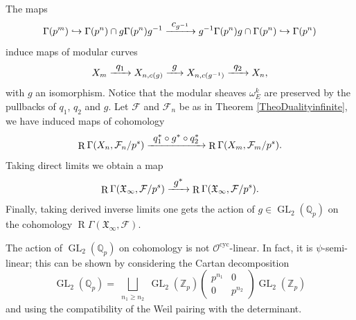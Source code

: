 \documentclass[11pt]{article}
\newcommand\hto{\mathrel{\lhook\joinrel\to}}
\newcommand\To[1]{\mathchoice{\xrightarrow{\textstyle\kern4pt#1\kern3pt}}{\stackrel{#1}{\to}}{}{}}
\newcommand{\cyc}{\mathrm{cyc}}
\numberwithin{equation}{section}
\theoremstyle{definition}
\newcommand{\bb}[1]{\mathbb{#1}}
\newcommand{\n}[1]{\mathcal{#1}}
\newcommand{\f}[1]{\mathfrak{#1}}
\DeclareMathOperator{\GL}{GL}
\DeclareMathOperator{\R}{R}
\begin{document}
The maps
\[
\Gamma(p^m)\hto \Gamma(p^n)\cap g\Gamma(p^n)g^{-1}\To{c_{g^{-1}}} g^{-1}\Gamma(p^n)g \cap \Gamma(p^n)\hto \Gamma(p^n)
\]
induce maps of modular curves
\[
X_m \To{q_1} X_{n,c(g)} \To{g} X_{n,c(g^{-1})} \To{q_2} X_{n},
\]
with $g$ an isomorphism. Notice that the modular sheaves $\omega^k_E$ are preserved by the pullbacks of $q_1$, $q_2$ and $g$. Let $\n{F}$ and $\n{F}_n$ be as in Theorem \ref{TheoDualityinfinite}, we have induced maps of cohomology
\[
\R\Gamma(X_n, \n{F}_n/p^s) \To{ q_1^* \circ g^*\circ q_2^*} \R\Gamma(X_{m}, \n{F}_m/p^s).
\]
Taking direct limits we obtain a map
\[
\R\Gamma(\f{X}_{\infty}, \n{F}/p^s)\To{g^*} \R\Gamma(\f{X}_{\infty}, \n{F}/p^s).
\]
Finally, taking derived inverse limits one gets the action of $g\in \GL_2(\bb{Q}_p)$ on the cohomology $\R\Gamma(\f{X}_{\infty}, \n{F})$.

The action of $\GL_2(\bb{Q}_p)$ on cohomology is not $\n{O}^{\cyc}$-linear. In fact, it is $\psi$-semi-linear; this can be shown by considering the Cartan decomposition
\[\GL_2(\bb{Q}_p)= \bigsqcup_{\substack{n_1 \geq n_2 }} \GL_2(\bb{Z}_p) \left(\begin{matrix} p^{n_1} & 0 \\ 0 & p^{n_2} \end{matrix} \right) \GL_2(\bb{Z}_p)
\]
and using the compatibility of the Weil pairing with the determinant.
\end{document}
